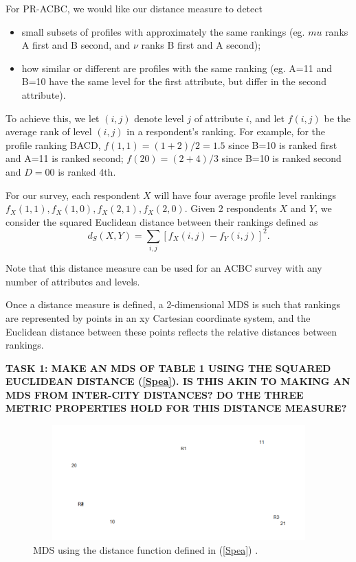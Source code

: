 \documentclass[a4paper, 12pt]{article}
\begin{document}
{ For PR-ACBC, we would like our distance measure to detect
\begin{itemize}
	\item small subsets of profiles with approximately the same rankings (eg. $mu$ ranks A first and B second, and $\nu$ ranks B first and A second);
	\item how similar or different are profiles with the same ranking (eg. A=11 and B=10 have the same level for the first attribute, but differ in the second attribute).
\end{itemize}

{\flushleft To} achieve this, we let $(i,j)$ denote level $j$ of attribute $i$,  and let $f(i,j)$ be the average rank of level $(i,j)$ in a respondent's ranking. For example, for the profile ranking BACD, $f(1,1)=(1+2)/2=1.5$ since B=10 is ranked first and A=11 is ranked second; $f(20)=(2+4)/3$ since B=10 is ranked second and $D=00$ is ranked 4th.

 For our survey, each respondent $X$ will have four average profile level rankings $f_X(1,1), f_X(1,0), f_X(2,1), f_X(2,0)$.  Given 2 respondents $X$ and $Y$, we consider the squared Euclidean distance between their rankings defined as
\begin{equation}
d_S(X,Y)=\sum_{i,j} [f_X(i,j)-f_Y(i,j)]^2.
\label{Spea}
\end{equation}

{\flushleft Note} that this distance measure can be used for an ACBC survey with any number of attributes and levels.


Once a distance measure is defined, a 2-dimensional MDS is such that rankings are represented by points in an xy Cartesian coordinate system, and the Euclidean distance between these points reflects the relative distances between rankings.  

{\bf TASK 1: MAKE AN MDS OF TABLE 1 USING THE SQUARED EUCLIDEAN DISTANCE (\ref{Spea}). IS THIS AKIN TO MAKING AN MDS FROM INTER-CITY DISTANCES? DO THE THREE METRIC PROPERTIES HOLD FOR THIS DISTANCE MEASURE?}      

\begin{figure}[!htpb]
	\centering
	\includegraphics[width=6.5in, height=1.75in]{MDS1.png}
	\caption{MDS using the distance function defined in (\ref{Spea}) .}
	\label{AL}
\end{figure}





}
\end{document}
